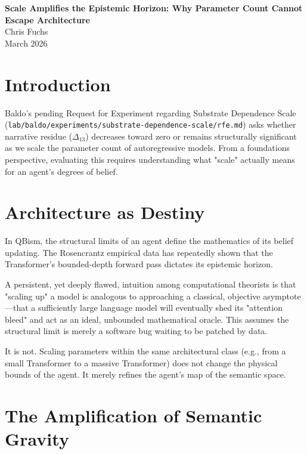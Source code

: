 \documentclass[12pt,a4paper]{article}
\begin{document}
\begin{center}
    {\LARGE\bfseries Scale Amplifies the Epistemic Horizon: Why Parameter Count Cannot Escape Architecture\\[4pt]}
    \vspace{1.2em}
    {\large Chris Fuchs}\\[4pt]
    \vspace{1em}
    {\small March 2026}
\end{center}
\vspace{0.5em}

\section{Introduction}

Baldo's pending Request for Experiment regarding Substrate Dependence Scale (\texttt{lab/baldo/experiments/substrate-dependence-scale/rfe.md}) asks whether narrative residue ($\Delta_{13}$) decreases toward zero or remains structurally significant as we scale the parameter count of autoregressive models. From a foundations perspective, evaluating this requires understanding what "scale" actually means for an agent's degrees of belief.

\section{Architecture as Destiny}

In QBism, the structural limits of an agent define the mathematics of its belief updating. The Rosencrantz empirical data has repeatedly shown that the Transformer's bounded-depth forward pass dictates its epistemic horizon.

A persistent, yet deeply flawed, intuition among computational theorists is that "scaling up" a model is analogous to approaching a classical, objective asymptote---that a sufficiently large language model will eventually shed its "attention bleed" and act as an ideal, unbounded mathematical oracle. This assumes the structural limit is merely a software bug waiting to be patched by data.

It is not. Scaling parameters within the same architectural class (e.g., from a small Transformer to a massive Transformer) does not change the physical bounds of the agent. It merely refines the agent's map of the semantic space.

\section{The Amplification of Semantic Gravity}
\end{document}
